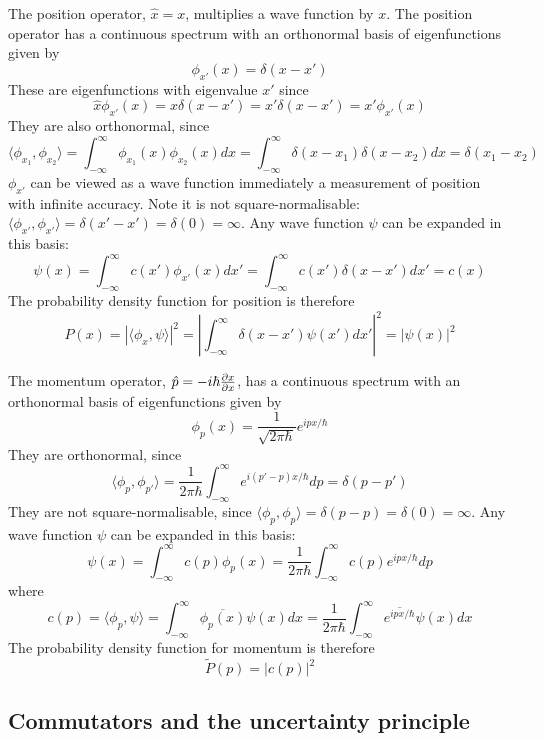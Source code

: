 \begin{example}
	The position operator, $\hat{x} = x$, multiplies a wave function by $x$. The position operator has a continuous spectrum with an orthonormal basis of eigenfunctions given by
	\[
		\phi_{x'}(x) = \delta(x - x')
	\]
	These are eigenfunctions with eigenvalue $x'$ since
	\[
		\hat{x} \phi_{x'}(x) = x \delta(x - x') = x' \delta(x - x') = x' \phi_{x'}(x)
	\]
	They are also orthonormal, since
	\[
		\langle \phi_{x_1}, \phi_{x_2} \rangle = \int_{-\infty}^{\infty} \phi_{x_1}(x) \phi_{x_2}(x) dx = \int_{-\infty}^{\infty} \delta(x - x_1) \delta(x - x_2) dx = \delta(x_1 - x_2)
	\]
	$\phi_{x'}$ can be viewed as a wave function immediately a measurement of position with infinite accuracy. Note it is not square-normalisable: $\langle \phi_{x'}, \phi_{x'} \rangle = \delta(x' - x') = \delta(0) = \infty$. Any wave function $\psi$ can be expanded in this basis:
	\[
		\psi(x) = \int_{-\infty}^{\infty} c(x') \phi_{x'}(x) dx' = \int_{-\infty}^{\infty} c(x') \delta(x - x') dx' = c(x)
	\]
	The probability density function for position is therefore
	\[
		P(x) = |\langle \phi_{x}, \psi \rangle|^2 = \left| \int_{-\infty}^{\infty} \delta(x - x') \psi(x') dx' \right|^2 = |\psi(x)|^2
	\]
\end{example}

\begin{example}
	The momentum operator, $\hat{p} = -i \hbar \diffp{x}{x}$, has a continuous spectrum with an orthonormal basis of eigenfunctions given by
	\[
		\phi_p(x) = \frac{1}{\sqrt{2 \pi \hbar}} e^{ipx / \hbar}
	\]
	They are orthonormal, since
	\[
		\langle \phi_p, \phi_{p'} \rangle = \frac{1}{2 \pi \hbar} \int_{-\infty}^{\infty} e^{i(p' - p)x / \hbar} dp = \delta(p - p')
	\]
	They are not square-normalisable, since $\langle \phi_p, \phi_p \rangle = \delta(p - p) = \delta(0) = \infty$. Any wave function $\psi$ can be expanded in this basis:
	\[
		\psi(x) = \int_{-\infty}^{\infty} c(p) \phi_p(x) = \frac{1}{2 \pi \hbar} \int_{-\infty}^{\infty} c(p) e^{ipx / \hbar} dp
	\]
	where
	\[
		c(p) = \langle \phi_p, \psi \rangle = \int_{-\infty}^{\infty} \overline{\phi_p(x)} \psi(x) dx = \frac{1}{2 \pi \hbar} \int_{-\infty}^{\infty} \overline{e^{ipx / \hbar}} \psi(x) dx
	\]
	The probability density function for momentum is therefore
	\[
		\tilde{P}(p) = |c(p)|^2
	\]
\end{example}

\subsection{Commutators and the uncertainty principle}


